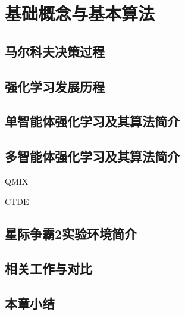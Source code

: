 
\chapter{基础概念与基本算法}
\section{马尔科夫决策过程}

\section{强化学习发展历程}

\section{单智能体强化学习及其算法简介}

\section{多智能体强化学习及其算法简介}

QMIX

CTDE

\section{星际争霸2实验环境简介}

\section{相关工作与对比}

\section{本章小结}

